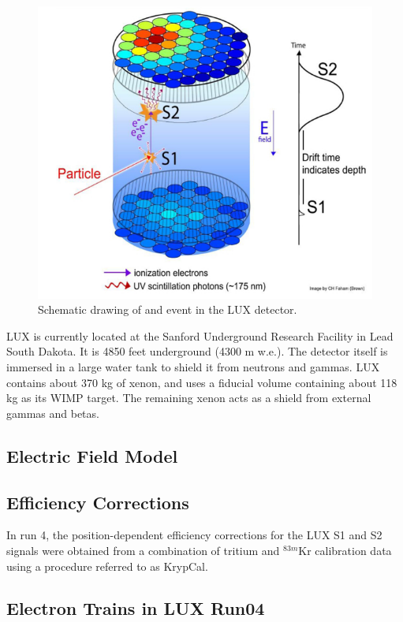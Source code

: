 \begin{figure}[h!]
\centering
\includegraphics[width=150mm]{Figures/luxevent.png}
\caption{Schematic drawing of and event in the LUX detector.\cite{lux2012}}
\label{fig:lux} 
\end{figure}

 LUX is currently located at the Sanford Underground Research Facility in Lead South Dakota. It is 4850 feet underground (4300 m w.e.). The detector itself is immersed in a large water tank to shield it from neutrons and gammas. LUX contains about 370 kg of xenon, and uses a fiducial volume containing about 118 kg as its WIMP target. The remaining xenon acts as a shield from external gammas and betas. 
 
 \subsection{Electric Field Model}\label{sec:efield}
 \cite{lux_efield}
 
 
 \subsection{Efficiency Corrections}\label{sec:krypcal}
 In run 4, the position-dependent efficiency corrections for the LUX S1 and S2 signals were obtained from a combination of tritium and $^{83m}$Kr calibration data using a procedure referred to as KrypCal\cite{richard}.  
 
\subsection{Electron Trains in LUX Run04} \label{sec:etrain}
 
